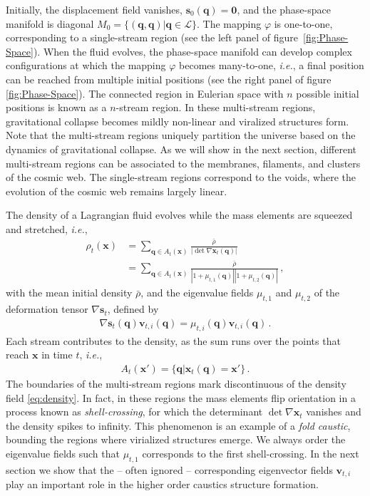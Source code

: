 \documentclass[a4paper, 11pt]{article}
\begin{document}
Initially, the displacement field vanishes, $\bm{s}_0(\bm{q})=\bm{0}$, and the phase-space manifold is diagonal $M_0=\{(\bm{q},\bm{q})|\bm{q} \in \mathcal{L}\}$. The mapping $\varphi$ is one-to-one, corresponding to a single-stream region (see the left panel of figure\ \ref{fig:Phase-Space}). When the fluid evolves, the phase-space manifold can develop complex configurations at which the mapping $\varphi$ becomes many-to-one, \textit{i.e.}, a final position can be reached from multiple initial positions (see the right panel of figure \ref{fig:Phase-Space}). The connected region in Eulerian space with $n$ possible initial positions is known as a $n$-stream region. In these multi-stream regions, gravitational collapse becomes mildly non-linear and viralized structures form. Note that the multi-stream regions uniquely partition the universe based on the dynamics of gravitational collapse. As we will show in the next section, different multi-stream regions can be associated to the membranes, filaments, and clusters of the cosmic web. The single-stream regions correspond to the voids, where the evolution of the cosmic web remains largely linear.

The density of a Lagrangian fluid evolves while the mass elements are squeezed and stretched, \textit{i.e.},
\begin{align}
\rho_t(\bm{x})
&= \sum_{\bm{q} \in A_t(\bm{x})} \frac{\bar{\rho}}{|\det \nabla \bm{x}_t(\bm{q})|}\\
&= \sum_{\bm{q} \in A_t(\bm{x})} \frac{\bar{\rho}}{|1+\mu_{t,1}(\bm{q})||1+\mu_{t,2}(\bm{q})|}\,,
\label{eq:density}
\end{align}
with the mean initial density $\bar{\rho}$, and the eigenvalue fields $\mu_{t,1}$ and $\mu_{t,2}$ of the deformation tensor $\nabla \bm{s}_t$, defined by
\begin{align}
\nabla \bm{s}_t(\bm{q}) \bm{v}_{t,i}(\bm{q}) = \mu_{t,i}(\bm{q}) \bm{v}_{t,i}(\bm{q})\,.
\label{eq:EigenvalueAndEigenvector}
\end{align} 
Each stream contributes to the density, as the sum runs over the points that reach $\bm{x}$ in time $t$, \textit{i.e.},
\begin{align}
A_t(\bm{x}') = \{\bm{q}|\bm{x}_t(\bm{q})=\bm{x}'\}\,.
\end{align}
The boundaries of the multi-stream regions mark discontinuous of the density field \eqref{eq:density}. In fact, in these regions the mass elements flip orientation in a process known as \textit{shell-crossing}, for which the determinant $\det \nabla \bm{x}_t$ vanishes and the density spikes to infinity. This phenomenon is an example of a \textit{fold caustic}, bounding the regions where virialized structures emerge. We always order the eigenvalue fields such that $\mu_{t,1}$ corresponds to the first shell-crossing. In the next section we show that the -- often ignored -- corresponding eigenvector fields $\bm{v}_{t,i}$ play an important role in the higher order caustics structure formation. 
\end{document}
